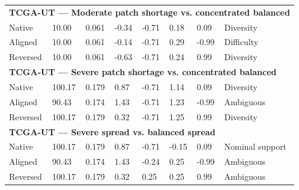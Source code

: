 \begin{tabular}{llllllll}
\midrule
\multicolumn{8}{l}{\textbf{TCGA-UT --- Moderate patch shortage vs. concentrated balanced}} \\
Native & 10.00 & 0.061 & -0.34 & -0.71 & 0.18 & 0.09 & Diversity \\
Aligned & 10.00 & 0.061 & -0.14 & -0.71 & 0.29 & -0.99 & Difficulty \\
Reversed & 10.00 & 0.061 & -0.63 & -0.71 & 0.24 & 0.99 & Diversity \\
\midrule
\multicolumn{8}{l}{\textbf{TCGA-UT --- Severe patch shortage vs. concentrated balanced}} \\
Native & 100.17 & 0.179 & 0.87 & -0.71 & 1.14 & 0.09 & Diversity \\
Aligned & 90.43 & 0.174 & 1.43 & -0.71 & 1.23 & -0.99 & Ambiguous \\
Reversed & 100.17 & 0.179 & 0.32 & -0.71 & 1.25 & 0.99 & Diversity \\
\midrule
\multicolumn{8}{l}{\textbf{TCGA-UT --- Severe spread vs. balanced spread}} \\
Native & 100.17 & 0.179 & 0.87 & -0.71 & -0.15 & 0.09 & Nominal support \\
Aligned & 90.43 & 0.174 & 1.43 & -0.24 & 0.25 & -0.99 & Ambiguous \\
Reversed & 100.17 & 0.179 & 0.32 & 0.25 & 0.25 & 0.99 & Ambiguous \\
\bottomrule
\end{tabular}
